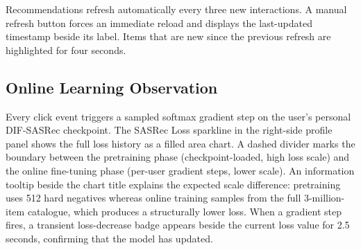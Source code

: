 Recommendations refresh automatically every three new interactions.
A manual refresh button forces an immediate reload and displays the last-updated timestamp beside its label.
Items that are new since the previous refresh are highlighted for four seconds.

\subsection{Online Learning Observation}

Every click event triggers a sampled softmax gradient step on the user's personal DIF-SASRec checkpoint.
The SASRec Loss sparkline in the right-side profile panel shows the full loss history as a filled area chart.
A dashed divider marks the boundary between the pretraining phase (checkpoint-loaded, high loss scale) and the online fine-tuning phase (per-user gradient steps, lower scale).
An information tooltip beside the chart title explains the expected scale difference: pretraining uses 512 hard negatives whereas online training samples from the full 3-million-item catalogue, which produces a structurally lower loss.
When a gradient step fires, a transient loss-decrease badge appears beside the current loss value for 2.5 seconds, confirming that the model has updated.
